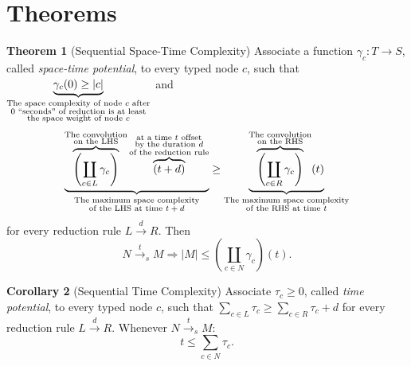 \documentclass{fit-teorsem}
\begin{document}
\section*{Theorems}
\textbf{Theorem 1} (Sequential Space-Time Complexity) Associate a function $\gamma_c : T \to S$,
called \textit{space-time potential}, to every typed node $c$, such that
$\underbrace{\gamma_c(0) \ge |c|}_{\begin{subarray}{c}
	\text{The space complexity of node $c$ after} \\
	\text{$0$ ``seconds'' of reduction is at least} \\
	\text{the space weight of node $c$}
\end{subarray}}$ and \[
	\underbrace{\overbrace{\left(\coprod_{c \in L} \gamma_c\right)}^{\begin{subarray}{c}
			\text{The convolution} \\
			\text{on the LHS}
		\end{subarray}}\overbrace{(t + d)}^{\begin{subarray}{c}
			\text{at a time $t$ offset} \\
			\text{by the duration $d$} \\
			\text{of the reduction rule}
		\end{subarray}}}_{
	\begin{subarray}{c}
		\text{The maximum space complexity} \\
		\text{of the LHS at time $t + d$}
	\end{subarray}}
		\ge \underbrace{\overbrace{\left(\coprod_{c \in R} \gamma_c\right)}^{\begin{subarray}{c}
				\text{The convolution} \\
				\text{on the RHS}
			\end{subarray}}(t)}_{
		\begin{subarray}{c}
			\text{The maximum space complexity} \\
			\text{of the RHS at time $t$}
		\end{subarray}}
\] for every reduction rule $L \stackrel{d}{\longrightarrow} R$. Then \[
	N \stackrel{t}{\longrightarrow}_s M
		\Longrightarrow |M| \le \left(\coprod_{c \in N} \gamma_c\right)(t)
.\]

\textbf{Corollary 2} (Sequential Time Complexity) Associate $\tau_c \ge 0$, called \textit{time potential},
to every typed node $c$, such that $\sum_{c \in L} \tau_c \ge \sum_{c \in R} \tau_c + d$ for
every reduction rule $L \stackrel{d}{\longrightarrow} R$. Whenever
$N \stackrel{t}{\longrightarrow}_s M$: \[
	t \le \sum_{c \in N} \tau_c
.\]
\end{document}
